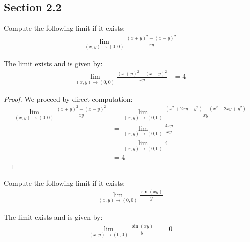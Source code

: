 \subsection{Section 2.2}
\begin{tcolorbox}[
        title={Problem 8 (a)},
        valign=center,
        nobeforeafter,
        colframe=gray!95!black
    ]
Compute the following limit if it exists:
    \begin{align}
        \lim_{(x, y) \rightarrow (0, 0)} \frac{(x + y)^2 - (x - y)^2}{xy}
    \end{align}
\end{tcolorbox}

\begin{claim}
    The limit exists and is given by:
    \begin{align}
        \lim_{(x, y) \rightarrow (0, 0)} \frac{(x + y)^2 - (x - y)^2}{xy} &= 4
    \end{align}
\end{claim}

\begin{proof} We proceed by direct computation:
    \begin{align*}
        \lim_{(x, y) \rightarrow (0, 0)} \frac{(x + y)^2 - (x - y)^2}{xy} &= \lim_{(x, y) \rightarrow (0, 0)} \frac{\left(x^2 + 2xy + y^2\right) - \left(x^2 - 2xy + y^2\right)}{xy} \\
        &= \lim_{(x, y) \rightarrow (0, 0)} \frac{4xy}{xy} \\
        &= \lim_{(x, y) \rightarrow (0, 0)} 4 \\
        &= 4
    \end{align*}
\end{proof}

\begin{tcolorbox}[
        title={Problem 8 (b)},
        valign=center,
        nobeforeafter,
        colframe=gray!95!black
    ]
Compute the following limit if it exists:
    \begin{align}
        \lim_{(x, y) \rightarrow (0, 0)} \frac{\sin(xy)}{y}
    \end{align}
\end{tcolorbox}

\begin{claim}
    The limit exists and is given by:
    \begin{align}
        \lim_{(x, y) \rightarrow (0, 0)} \frac{\sin(xy)}{y} &= 0
    \end{align}
\end{claim}

